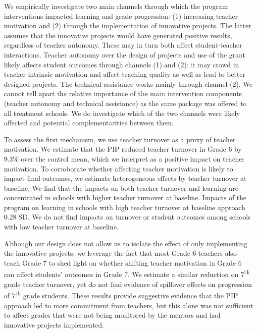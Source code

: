 \documentclass[11pt,a4paper]{article}
\begin{document}

We empirically investigate two main channels through which the program interventions impacted learning and grade progression: (1) increasing teacher motivation and (2) through the implementation of innovative projects. The latter assumes that the innovative projects would have generated positive results, regardless of teacher autonomy. These may in turn both affect student-teacher interactions. Teacher autonomy over the design of projects and use of the grant likely affects student outcomes through channels (1) and (2): it may crowd in teacher intrinsic motivation and affect teaching quality as well as lead to better designed projects. The technical assistance works mainly through channel (2). We cannot tell apart the relative importance of the main intervention components (teacher autonomy and technical assistance) as the same package was offered to all treatment schools. We do investigate which of the two channels were likely affected and potential complementarities between them.


To assess the first mechanism, we use teacher turnover as a proxy of teacher motivation. We estimate that the PIP reduced teacher turnover in Grade 6 by 9.3\% over the control mean, which we interpret as a positive impact on teacher motivation. To corroborate whether affecting teacher motivation is likely to impact final outcomes, we estimate heterogeneous effects by teacher turnover at baseline. We find that the impacts on both teacher turnover and learning are concentrated in schools with higher teacher turnover at baseline. Impacts of the program on learning in schools with high teacher turnover at baseline approach 0.28 SD. We do not find impacts on turnover or student outcomes among schools with low teacher turnover at baseline. 

Although our design does not allow us to isolate the effect of only implementing the innovative projects, we leverage the fact that most Grade 6 teachers also teach Grade 7 to shed light on whether shifting teacher motivation in Grade 6 can affect students' outcomes in Grade 7. We estimate a similar reduction on 7\textsuperscript{th} grade teacher turnover, yet do not find evidence of spillover effects on progression of 7\textsuperscript{th} grade students. These results provide suggestive evidence that the PIP approach led to more commitment from teachers, but this alone was not sufficient to affect grades that were not being monitored by the mentors and had innovative projects implemented.
\end{document}
